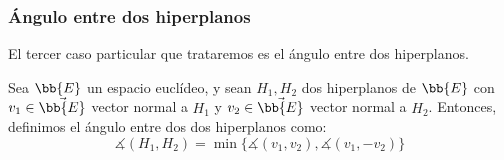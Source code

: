 \subsubsection{Ángulo entre dos hiperplanos}

El tercer caso particular que trataremos es el ángulo entre dos hiperplanos.
\begin{definicion}
    Sea $\bb{E}$ un espacio euclídeo, y sean $H_1, H_2$ dos hiperplanos de $\bb{E}$ con $v_{1}\in \vec{\bb{E}}$ vector normal a $H_1$ y $v_{2}\in \vec{\bb{E}}$ vector normal a $H_2$.
    Entonces, definimos el ángulo entre dos dos hiperplanos como:
    \begin{equation*}
        \measuredangle(H_1,H_2) = \min\{\measuredangle(v_1,v_2), \measuredangle(v_1,-v_2)\}
    \end{equation*}
\end{definicion}
